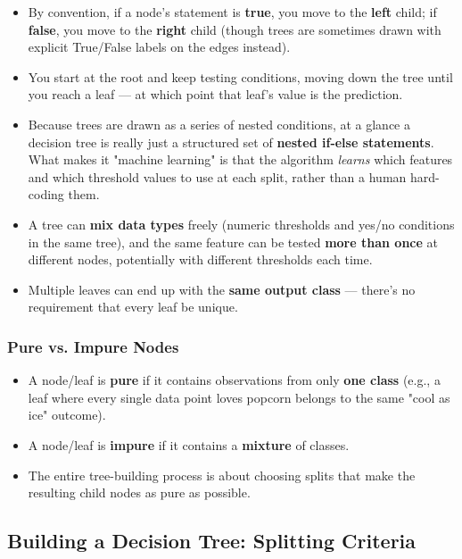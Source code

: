 \documentclass[12pt,openany]{book}
\begin{document}
\begin{itemize}[leftmargin=*]
    \item By convention, if a node's statement is \textbf{true}, you move to the \textbf{left} child; if \textbf{false}, you move to the \textbf{right} child (though trees are sometimes drawn with explicit True/False labels on the edges instead).
    \item You start at the root and keep testing conditions, moving down the tree until you reach a leaf --- at which point that leaf's value is the prediction.
    \item Because trees are drawn as a series of nested conditions, at a glance a decision tree is really just a structured set of \textbf{nested if-else statements}. What makes it "machine learning" is that the algorithm \textit{learns} which features and which threshold values to use at each split, rather than a human hard-coding them.
    \item A tree can \textbf{mix data types} freely (numeric thresholds and yes/no conditions in the same tree), and the same feature can be tested \textbf{more than once} at different nodes, potentially with different thresholds each time.
    \item Multiple leaves can end up with the \textbf{same output class} --- there's no requirement that every leaf be unique.
\end{itemize}


\subsubsection{Pure vs. Impure Nodes}

\begin{itemize}[leftmargin=*]
    \item A node/leaf is \textbf{pure} if it contains observations from only \textbf{one class} (e.g., a leaf where every single data point loves popcorn belongs to the same "cool as ice" outcome).
    \item A node/leaf is \textbf{impure} if it contains a \textbf{mixture} of classes.
    \item The entire tree-building process is about choosing splits that make the resulting child nodes as pure as possible.
\end{itemize}


\medskip


\subsection{Building a Decision Tree: Splitting Criteria}
\end{document}
